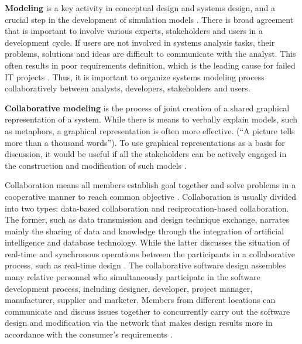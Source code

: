 
\textbf{Modeling} is a key activity in conceptual design and systems design, and a crucial step in the development of simulation models \cite{barjis2008importance,brooks2006some,robinson2008conceptual}. There is broad agreement that is important to involve various experts, stakeholders and users in a development cycle. If users are not involved in systems analysis tasks, their problems, solutions and ideas are difficult to communicate with the analyst. This often results in poor requirements definition, which is the leading cause for failed IT projects \cite{boehm2001developing}. Thus, it is important to organize systems modeling process collaboratively between analysts, developers, stakeholders and users. 

\textbf{Collaborative modeling} is the process of joint creation of a shared graphical representation of a system. While there is means to verbally explain models, such as metaphors, a graphical representation is often more effective. (“A picture tells more than a thousand words”). To use graphical representations as a basis for discussion, it would be useful if all the stakeholders can be actively engaged in the construction and modification of such models \cite{renger2008challenges}. 

Collaboration means all members establish goal together and solve problems in a cooperative manner to reach common objective \cite{kvan2000collaborative}. Collaboration is usually divided into two types: data-based collaboration and reciprocation-based collaboration. The former, such as data transmission and design technique exchange, narrates mainly the sharing of data and knowledge through the integration of artificial intelligence and database technology. While the latter discusses the situation of real-time and synchronous operations between the participants in a collaborative process, such as real-time design \cite{cera2004role}. The collaborative software design assembles many relative personnel who simultaneously participate in the software development process, including designer, developer, project manager, manufacturer, supplier and marketer. Members from different locations can communicate and discuss issues together to concurrently carry out the software design and modification via the network that makes design results more in accordance with the consumer’s requirements \cite{tang2004agent}.

